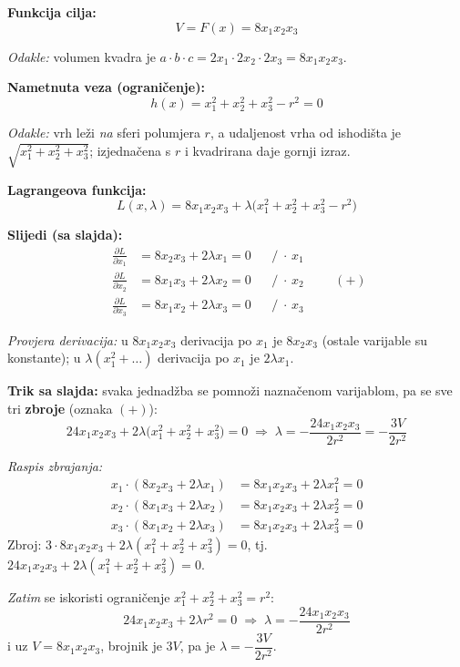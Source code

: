 \textbf{Funkcija cilja:}
\[
V = F(x) = 8x_1x_2x_3
\]

\emph{Odakle:} volumen kvadra je $a\cdot b\cdot c = 2x_1 \cdot 2x_2 \cdot 2x_3
= 8x_1x_2x_3$. \checkmark

\textbf{Nametnuta veza (ograničenje):}
\[
h(x) = x_1^2 + x_2^2 + x_3^2 - r^2 = 0
\]

\emph{Odakle:} vrh leži \emph{na} sferi polumjera $r$, a udaljenost vrha od
ishodišta je $\sqrt{x_1^2+x_2^2+x_3^2}$; izjednačena s $r$ i kvadrirana daje
gornji izraz.

\textbf{Lagrangeova funkcija:}
\[
L(x,\lambda) = 8x_1x_2x_3 + \lambda\big(x_1^2 + x_2^2 + x_3^2 - r^2\big)
\]

\textbf{Slijedi (sa slajda):}
\[
\begin{aligned}
\frac{\partial L}{\partial x_1} &= 8x_2x_3 + 2\lambda x_1 = 0
  &&\big/\;\cdot\, x_1 \\
\frac{\partial L}{\partial x_2} &= 8x_1x_3 + 2\lambda x_2 = 0
  &&\big/\;\cdot\, x_2 \\
\frac{\partial L}{\partial x_3} &= 8x_1x_2 + 2\lambda x_3 = 0
  &&\big/\;\cdot\, x_3
\end{aligned}
\qquad (+)
\]

\emph{Provjera derivacija:} u $8x_1x_2x_3$ derivacija po $x_1$ je $8x_2x_3$
(ostale varijable su konstante); u $\lambda(x_1^2+\dots)$ derivacija po $x_1$ je
$2\lambda x_1$. \checkmark

\textbf{Trik sa slajda:} svaka jednadžba se pomnoži naznačenom varijablom, pa se
sve tri \textbf{zbroje} (oznaka $(+)$):
\[
24x_1x_2x_3 + 2\lambda\big(x_1^2 + x_2^2 + x_3^2\big) = 0
\;\Longrightarrow\;
\lambda = -\frac{24x_1x_2x_3}{2r^2} = -\frac{3V}{2r^2}
\]

\emph{Raspis zbrajanja:}
\begin{align}
x_1 \cdot (8x_2x_3 + 2\lambda x_1) &= 8x_1x_2x_3 + 2\lambda x_1^2 = 0 \\
x_2 \cdot (8x_1x_3 + 2\lambda x_2) &= 8x_1x_2x_3 + 2\lambda x_2^2 = 0 \\
x_3 \cdot (8x_1x_2 + 2\lambda x_3) &= 8x_1x_2x_3 + 2\lambda x_3^2 = 0
\end{align}
Zbroj: $3\cdot 8x_1x_2x_3 + 2\lambda(x_1^2+x_2^2+x_3^2) = 0$, tj.\
$24x_1x_2x_3 + 2\lambda(x_1^2+x_2^2+x_3^2) = 0$. \checkmark

\emph{Zatim} se iskoristi ograničenje $x_1^2+x_2^2+x_3^2 = r^2$:
\[
24x_1x_2x_3 + 2\lambda r^2 = 0
\;\Longrightarrow\;
\lambda = -\frac{24x_1x_2x_3}{2r^2}
\]
i uz $V = 8x_1x_2x_3$, brojnik je $3V$, pa je $\lambda = -\dfrac{3V}{2r^2}$.
\checkmark


